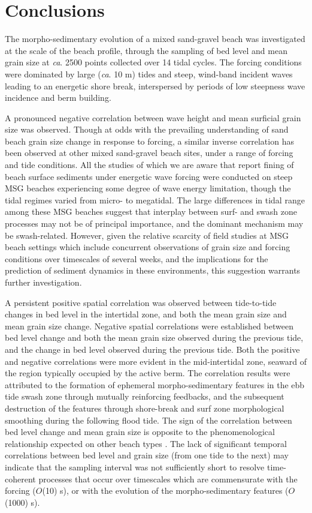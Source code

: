 \documentclass[preprint,12pt,authoryear]{elsarticle}
\begin{document}
\section{Conclusions}\label{Conclusions}

The morpho-sedimentary evolution of a mixed sand-gravel beach was investigated at the scale of the beach profile, through the sampling of bed level and mean grain size at \textit{ca}. 2500 points collected over 14 tidal cycles. The forcing conditions were dominated by large (\textit{ca}. 10 m) tides and steep, wind-band incident waves leading to an energetic shore break, interspersed by periods of low steepness wave incidence and berm building. 

A pronounced negative correlation between wave height and mean surficial grain size was observed. Though at odds with the prevailing understanding of sand beach grain size change in response to forcing, a similar inverse correlation has been observed at other mixed sand-gravel beach sites, under a range of forcing and tide conditions. All the studies of which we are aware that report fining of beach surface sediments under energetic wave forcing were conducted on steep MSG beaches experiencing some degree of wave energy limitation, though the tidal regimes varied from micro- to megatidal. The large differences in tidal range among these MSG beaches suggest that interplay between surf- and swash zone processes may not be of principal importance, and the dominant mechanism may be swash-related. However, given the relative scarcity of field studies at MSG beach settings which include concurrent observations of grain size and forcing conditions over timescales of several weeks, and the implications for the prediction of sediment dynamics in these environments, this suggestion warrants further investigation. 

A persistent positive spatial correlation was observed between tide-to-tide changes in bed level in the intertidal zone, and both the mean grain size and mean grain size change. Negative spatial correlations were established between bed level change and both the mean grain size observed during the previous tide, and the change in bed level observed during the previous tide. Both the positive and negative correlations were more evident in the mid-intertidal zone, seaward of the region typically occupied by the active berm. The correlation results were attributed to the formation of ephemeral morpho-sedimentary features in the ebb tide swash zone through mutually reinforcing feedbacks, and the subsequent destruction of the features through shore-break and surf zone morphological smoothing during the following flood tide. The sign of the correlation between bed level change and mean grain size is opposite to the phenomenological relationship expected on other beach types \citep[e.g.,][]{Masselink_etal2007}. The lack of significant temporal correlations between bed level and grain size (from one tide to the next) may indicate that the sampling interval was not sufficiently short to resolve time-coherent processes that occur over timescales which are commensurate with the forcing ($O$(10) s), or with the evolution of the morpho-sedimentary features ($O$(1000) s).
\end{document}

